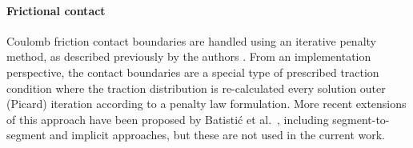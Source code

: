 \documentclass[sn-mathphys,Numbered]{sn-jnl}%
\begin{document}
\paragraph{Frictional contact}
Coulomb friction contact boundaries are handled using an iterative penalty method, as described previously by the authors \citep{cardiff_lagrangian_2017, cardiff_development_2012}.
From an implementation perspective, the contact boundaries are a special type of prescribed traction condition where the traction distribution is re-calculated every solution outer (Picard) iteration according to a penalty law formulation.
More recent extensions of this approach have been proposed by Batisti\'{c} et al.\ \citep{Batistic2022, Batistic2023}, including segment-to-segment and implicit approaches, but these are not used in the current work.

\end{document}
